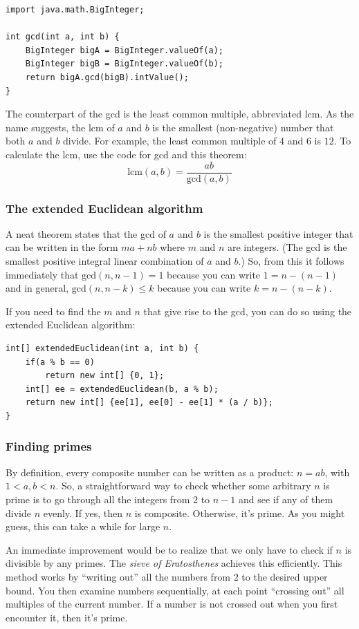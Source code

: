 \documentclass[a4paper,12pt]{article}
\begin{document}
\begin{lstlisting}
import java.math.BigInteger;

int gcd(int a, int b) {
	BigInteger bigA = BigInteger.valueOf(a);
	BigInteger bigB = BigInteger.valueOf(b);
	return bigA.gcd(bigB).intValue();
}
\end{lstlisting}

The counterpart of the gcd is the least common multiple, abbreviated lcm. As the name suggests, the lcm of $a$ and $b$ is the smallest (non-negative) number that both $a$ and $b$ divide. For example, the least common multiple of $4$ and $6$ is $12$. To calculate the lcm, use the code for gcd and this theorem:
\[\mathrm{lcm}(a,b) = \frac{ab}{\mathrm{gcd}(a,b)}\]

\subsubsection{The extended Euclidean algorithm}
A neat theorem states that the gcd of $a$ and $b$ is the smallest positive integer that can be written in the form $ma+nb$ where $m$ and $n$ are integers. (The gcd is the smallest positive integral linear combination of $a$ and $b$.) So, from this it follows immediately that $\mathrm{gcd}(n,n-1)=1$ because you can write $1=n-(n-1)$ and in general, $\mathrm{gcd}(n,n-k)\le k$ because you can write $k=n-(n-k)$.

If you need to find the $m$ and $n$ that give rise to the gcd, you can do so using the extended Euclidean algorithm:
\begin{lstlisting}
int[] extendedEuclidean(int a, int b) {
	if(a % b == 0)
		return new int[] {0, 1};
	int[] ee = extendedEuclidean(b, a % b);
	return new int[] {ee[1], ee[0] - ee[1] * (a / b)};
}
\end{lstlisting}

\subsubsection{Finding primes}

By definition, every composite number can be written as a product: $n=ab$, with $1 < a,b < n$. So, a straightforward way to check whether some arbitrary $n$ is prime is to go through all the integers from $2$ to $n-1$ and see if any of them divide $n$ evenly. If yes, then $n$ is composite. Otherwise, it's prime. As you might guess, this can take a while for large $n$.

An immediate improvement would be to realize that we only have to check if $n$ is divisible by any primes. The {\em sieve of Eratosthenes} achieves this efficiently. This method works by ``writing out'' all the numbers from $2$ to the desired upper bound. You then examine numbers sequentially, at each point ``crossing out'' all multiples of the current number. If a number is not crossed out when you first encounter it, then it's prime. 
\end{document}
